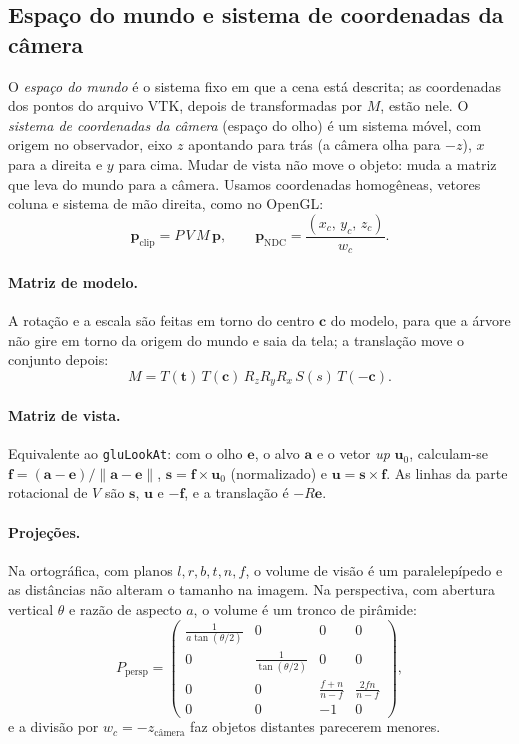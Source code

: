 \documentclass[11pt, a4paper]{article}
\begin{document}
\subsection{Espaço do mundo e sistema de coordenadas da câmera}
O \emph{espaço do mundo} é o sistema fixo em que a cena está descrita; as
coordenadas dos pontos do arquivo VTK, depois de transformadas por $M$, estão nele.
O \emph{sistema de coordenadas da câmera} (espaço do olho) é um sistema móvel,
com origem no observador, eixo $z$ apontando para trás (a câmera olha para $-z$),
$x$ para a direita e $y$ para cima. Mudar de vista não move o objeto: muda
a matriz que leva do mundo para a câmera. Usamos coordenadas homogêneas, vetores
coluna e sistema de mão direita, como no OpenGL:
\begin{equation}
  \mathbf{p}_{\text{clip}} = P\,V\,M\,\mathbf{p}, \qquad
  \mathbf{p}_{\text{NDC}} = \frac{(x_c,\,y_c,\,z_c)}{w_c}.
\end{equation}

\paragraph{Matriz de modelo.} A rotação e a escala são feitas em torno do centro
$\mathbf{c}$ do modelo, para que a árvore não gire em torno da origem do mundo e saia
da tela; a translação move o conjunto depois:
\begin{equation}
  M = T(\mathbf{t})\,T(\mathbf{c})\,R_z R_y R_x\,S(s)\,T(-\mathbf{c}).
\end{equation}

\paragraph{Matriz de vista.} Equivalente ao \texttt{gluLookAt}: com o olho $\mathbf{e}$,
o alvo $\mathbf{a}$ e o vetor \emph{up} $\mathbf{u}_0$, calculam-se
$\mathbf{f}=(\mathbf{a}-\mathbf{e})/\lVert\mathbf{a}-\mathbf{e}\rVert$,
$\mathbf{s}=\mathbf{f}\times\mathbf{u}_0$ (normalizado) e $\mathbf{u}=\mathbf{s}\times\mathbf{f}$.
As linhas da parte rotacional de $V$ são $\mathbf{s}$, $\mathbf{u}$ e $-\mathbf{f}$, e a
translação é $-R\mathbf{e}$.

\paragraph{Projeções.} Na ortográfica, com planos $l,r,b,t,n,f$, o volume de visão é um
paralelepípedo e as distâncias não alteram o tamanho na imagem. Na perspectiva, com
abertura vertical $\theta$ e razão de aspecto $a$, o volume é um tronco de pirâmide:
\begin{equation}
 P_{\text{persp}} =
 \begin{pmatrix}
  \frac{1}{a\tan(\theta/2)} & 0 & 0 & 0\\
  0 & \frac{1}{\tan(\theta/2)} & 0 & 0\\
  0 & 0 & \frac{f+n}{n-f} & \frac{2fn}{n-f}\\
  0 & 0 & -1 & 0
 \end{pmatrix},
\end{equation}
e a divisão por $w_c=-z_{\text{câmera}}$ faz objetos distantes parecerem menores.
\end{document}
